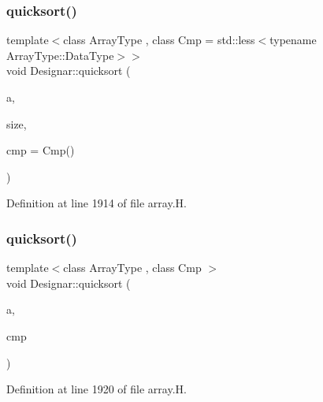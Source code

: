 \mbox{\label{namespace_designar_a3b84da2b14868b20993ec9687e3c29c4}} 
\subsubsection{\texorpdfstring{quicksort()}{quicksort()}\hspace{0.1cm}{\footnotesize\ttfamily [12/14]}}
{\footnotesize\ttfamily template$<$class Array\+Type , class Cmp  = std\+::less$<$typename Array\+Type\+::\+Data\+Type$>$$>$ \\
void Designar\+::quicksort (\begin{DoxyParamCaption}\item[{Array\+Type \&}]{a,  }\item[{\hyperlink{namespace_designar_a9d113d66a39e82b73727c72cd3a52f73}{lint\+\_\+t}}]{size,  }\item[{Cmp \&\&}]{cmp = {\ttfamily Cmp()} }\end{DoxyParamCaption})\hspace{0.3cm}{\ttfamily [inline]}}



Definition at line 1914 of file array.\+H.

\mbox{\label{namespace_designar_ae6156420cc82f38302cc7b7c837275b1}} 
\subsubsection{\texorpdfstring{quicksort()}{quicksort()}\hspace{0.1cm}{\footnotesize\ttfamily [13/14]}}
{\footnotesize\ttfamily template$<$class Array\+Type , class Cmp $>$ \\
void Designar\+::quicksort (\begin{DoxyParamCaption}\item[{Array\+Type \&}]{a,  }\item[{Cmp \&}]{cmp }\end{DoxyParamCaption})\hspace{0.3cm}{\ttfamily [inline]}}



Definition at line 1920 of file array.\+H.

\mbox{\label{namespace_designar_a75b9270f723888eb32e0b8f78032f0df}} 
